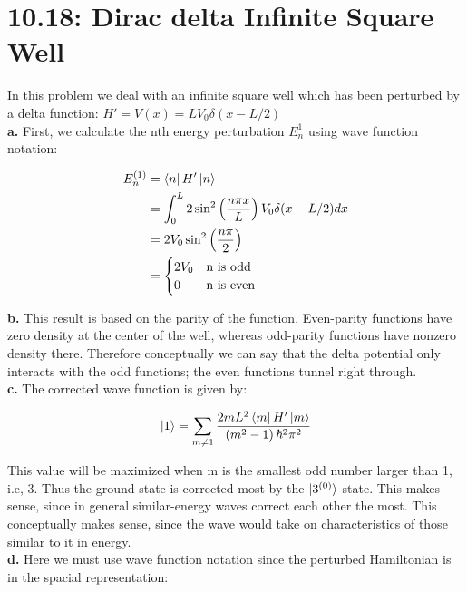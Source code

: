 \documentclass[10pt]{article} %
\begin{document}
\section{10.18: Dirac delta Infinite Square Well}
In this problem we deal with an infinite square well which has been perturbed by a delta function:
$H' = V(x) = LV_0\delta(x-L/2)$\\

\textbf{a.} First, we calculate the nth energy perturbation $E_n^1$ using wave function notation:

\begin{align*}
  E_n^{(1)} &= \bra{n}H'\ket{n}\\
  &= \int_0^L 2\sin^2\left(\frac{n\pi x}{L}\right)V_0\delta(x-L/2)dx\\
  &= 2V_0\sin^2\left(\frac{n\pi}{2}\right)\\
  &= \begin{cases}
    2V_0 & \mbox{n is odd}\\
    0 & \mbox{n is even}\\
  \end{cases}\\
\end{align*}

\textbf{b.}
This result is based on the parity of the function. Even-parity functions have zero density at the
center of the well, whereas odd-parity functions have nonzero density there. Therefore conceptually
we can say that the delta potential only interacts with the odd functions; the even functions tunnel
right through.\\

\textbf{c.}
The corrected wave function is given by:

\begin{align*}
  \ket{1} = \sum_{m\neq1} \frac{2mL^2\bra{m}H'\ket{m}}{\left(m^2-1\right)\hbar^2\pi^2}\\
\end{align*}

This value will be maximized when m is the smallest odd number larger than 1, i.e, 3. Thus the
ground state is corrected most by the $\ket{3^{(0)}}$ state. This makes sense, since in general
similar-energy waves correct each other the most. This conceptually makes sense, since the wave
would take on characteristics of those similar to it in energy.\\

\textbf{d.}
Here we must use wave function notation since the perturbed Hamiltonian is in the
spacial representation:
\end{document}
